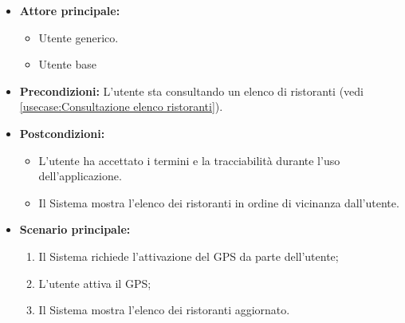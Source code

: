 \label{usecase:Abilitazione GPS}
\begin{itemize}
	\item \textbf{Attore principale:}
    \begin{itemize}
        \item Utente generico.
        \item Utente base
    \end{itemize}
	
	\item \textbf{Precondizioni:} L'utente sta consultando un elenco di ristoranti (vedi \autoref{usecase:Consultazione elenco ristoranti}).

	\item \textbf{Postcondizioni:}
    \begin{itemize}
        \item L'utente ha accettato i termini e la tracciabilità durante l'uso dell'applicazione.
        \item Il Sistema mostra l'elenco dei ristoranti in ordine di vicinanza dall'utente.
    \end{itemize}
	      
	\item \textbf{Scenario principale:}
	      \begin{enumerate}
		      \item Il Sistema richiede l'attivazione del GPS da parte dell'utente;

		      \item L'utente attiva il GPS;

		      \item Il Sistema mostra l'elenco dei ristoranti aggiornato.
	      \end{enumerate}

\end{itemize}

